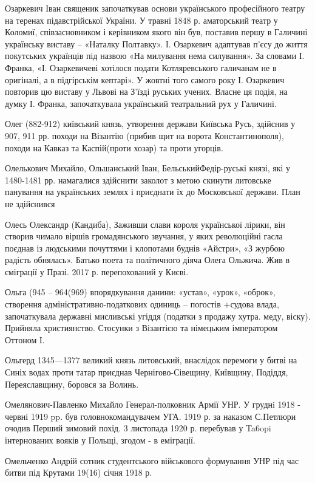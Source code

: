 Озаркевич Іван священик  започаткував основи українського професійного театру на теренах підавстрійської України. У травні 1848 р. аматорський театр у Коломиї, співзасновником і керівником якого він був, поставив першу в Галичині українську виставу – «Наталку Полтавку». І. Озаркевич адаптував п’єсу до життя покутських українців під назвою «На милування нема силування». За словами І. Франка, «І. Озаркевичеві хотілося подати Котляревського галичанам не в оригіналі, а в підгірськім кептарі». У жовтні того самого року І. Озаркевич повторив цю виставу у Львові на З’їзді руських учених. Власне ця подія, на думку І. Франка, започаткувала український театральний рух у Галичині. 

Олег (882-912) київський князь, утворення держави Київська Русь, здійснив у 907, 911 рр. походи на Візантію (прибив щит на ворота Константинополя), походи на Кавказ та Каспій(проти хозар) та проти угорців.

Олелькович Михайло, Ольшанський Іван, БельськийФедір-руські князі, які у 1480-1481 рр. намагалися здійснити заколот з метою скинути литовське панування на українських землях і приєднати їх до Московської держави. План не здійснився

Олесь Олександр (Кандиба), Заживши слави короля української лірики, він створив чимало віршів громадянського звучання, у яких революційні гасла поєднав із людськими почуттями і клопотами буднів «Айстри», «З журбою радість обнялась». Батько поета та політичного діяча Олега Ольжича. Жив в єміграції у Празі. 2017 р. перепохований у Києві.

Ольга (945 – 964(969) впорядкування данини: «устав», «урок», «оброк», створення адміністративно-податкових одиниць – погостів +судова влада, започаткувала державні мисливські угіддя (податки з продажу хутра. меду, віску). Прийняла християнство. Стосунки з Візантією та німецьким імператором Оттоном І.

Ольгерд 1345—1377 великий князь литовський, внаслідок перемоги у битві на Синіх водах проти татар приєднав Чернігово-Сівещину, Київщину, Подіддя, Переяславщину, боровся за Волинь.

Омелянович-Павленко Михайло  Генерал-полковник Армії УНР. У груднi 1918 - червні 1919 pp. був головнокомандувачем УГА. 1919 р. за наказом С.Петлюри очодив Перший зимовий похід. 3 листопада 1920 р. перебував у Ta6opi інтернованих вояків у Польщі, згодом - в еміграції. 

Омельченко Андрій сотник студентського військового формування УНР під час битви під Крутами 19(16) січня 1918 р. 

